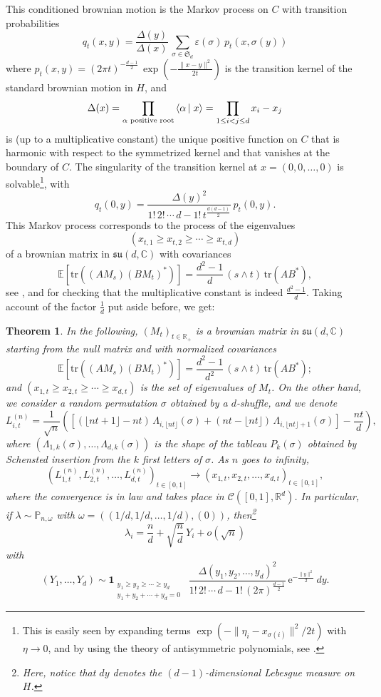 \documentclass[smallextended,nospthms]{svjour3}
\newtheorem{theorem}{Theorem}
\theoremstyle{remark}
\newcommand{\E}{\mathrm{e}}
\newcommand{\R}{\mathbb{R}}
\newcommand{\C}{\mathbb{C}}
\newcommand{\sym}{\mathfrak{S}}
\newcommand{\proba}{\mathbb{P}}
\newcommand{\esper}{\mathbb{E}}
\newcommand{\eps}{\varepsilon}
\newcommand{\scal}[2]{\left\langle #1\vphantom{#2}\,\right |\left.#2 \vphantom{#1}\right\rangle}
\begin{document}
This conditioned brownian motion is the Markov process on $C$ with transition probabilities
$$q_{t}(x,y)=\frac{\Delta(y)}{\Delta(x)}\,\sum_{\sigma \in \sym_{d}} \eps(\sigma)\,p_{t}(x,\sigma(y))$$
where $p_{t}(x,y)=(2\pi t)^{-\frac{d-1}{2}}\,\exp\left(-\frac{\|x-y\|^{2}}{2t}\right)$ is the transition kernel of the standard brownian motion in $H$, and 
$$\Delta(x)=\prod_{\alpha \text{ positive root}} \scal{\alpha}{x}=\prod_{1\leq i<j\leq d}x_{i}-x_{j}$$
is (up to a multiplicative constant) the unique positive function on $C$ that is harmonic with respect to the symmetrized kernel and that vanishes at the boundary of $C$. The singularity of the transition kernel at $x=(0,0,\ldots,0)$ is solvable\footnote{This is easily seen by expanding terms $\exp(-\|\eta_{i}-x_{\sigma(i)}\|^{2}/2t)$ with $\eta \to 0$, and by using the theory of antisymmetric polynomials, see \cite[\S1.3]{Mac95}.}, with
$$q_{t}(0,y)=\frac{\Delta(y)^{2} }{1!\,2!\,\cdots\,d-1!\,t^{\frac{d(d-1)}{2}}}\,p_{t}(0,y).$$
This Markov process corresponds to the process of the eigenvalues $$(x_{t,1}\geq x_{t,2}\geq \cdots \geq x_{t,d})$$ of a brownian matrix in $\mathfrak{su}(d,\C)$ with covariances
$$\esper[\mathrm{tr}((AM_{s})(BM_{t})^{*})]=\frac{d^{2}-1}{d}\,(s\wedge t)\,\mathrm{tr}(AB^{*}),$$
see \cite{Dys62,Bia09}, and \cite[Theorem 2.5.2]{AGZ09} for checking that the multiplicative constant is indeed $\frac{d^{2}-1}{d}$. Taking account of the factor $\frac{1}{d}$ put aside before, we get:
\begin{theorem}
In the following, $(M_{t})_{t \in \R_{+}}$ is a brownian matrix in $\mathfrak{su}(d,\C)$ starting from the null matrix and with normalized covariances
$$\esper[\mathrm{tr}((AM_{s})(BM_{t})^{*})]= \frac{d^{2}-1}{d^{2}}\,(s\wedge t)\,\mathrm{tr}(AB^{*});$$
and $(x_{1,t}\geq x_{2,t}\geq \cdots \geq x_{d,t})$ is the set of eigenvalues of $M_{t}$. On the other hand, we consider a random permutation $\sigma$ obtained by a $d$-shuffle, and we denote
$$L_{i,t}^{(n)}= \frac{1}{\sqrt{n}}\left(\left[(\lfloor nt +1\rfloor-nt)\,\Lambda_{i,\lfloor nt \rfloor}(\sigma)+ (nt-\lfloor nt\rfloor)\,\Lambda_{i,\lfloor nt \rfloor +1}(\sigma)\right]-\frac{nt}{d}\right),$$
where $(\Lambda_{1,k}(\sigma),\ldots,\Lambda_{d,k}(\sigma))$ is the shape of the tableau $P_{k}(\sigma)$ obtained by Schensted insertion from the $k$ first letters of $\sigma$. As $n$ goes to infinity,
$$\left(L_{1,t}^{(n)},L_{2,t}^{(n)},\ldots,L_{d,t}^{(n)}\right)_{t \in [0,1]} \to  (x_{1,t},x_{2,t},\ldots,x_{d,t})_{t \in [0,1]},$$
where the convergence is in law and takes place in $\mathscr{C}([0,1],\R^{d})$. In particular, if $\lambda \sim \proba_{n,\omega}$ with $\omega = ((1/d,1/d,\ldots,1/d),(0))$, then\footnote{Here, notice that $dy$ denotes the $(d-1)$-dimensional Lebesgue measure on $H$.}
$$\lambda_{i}=\frac{n}{d}+\sqrt{\frac{n}{d}}\,Y_{i}+o\left(\sqrt{n}\right)$$
with
$$(Y_{1},\ldots,Y_{d})\sim \mathbf{1}_{\substack{y_{1}\geq y_{2}\geq  \cdots \geq y_{d}\quad \\ y_{1}+y_{2}+\cdots+y_{d}=0}}\,\,\,\frac{\Delta(y_{1},y_{2},\ldots,y_{d})^{2}}{1!\,2!\,\cdots\,d-1!\,(2\pi)^{\frac{d-1}{2}}}\,\E^{-\frac{\|y\|^{2}}{2}}\,dy.$$
\end{theorem} 
\end{document}

